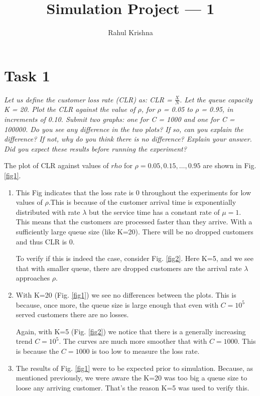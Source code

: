 \documentclass[10pt]{article}
\title{\textbf{Simulation Project --- 1}}
\author{Rahul Krishna}
\affil{North Carolina State University\\Email: \href{mailto:rkrish11@ncsu.edu}{rkrish11@ncsu.edu}\thanks{Source code: \url{https://github.com/rahlk/CSC579__Computer_Performance_Modeling}}}
\date{}
\begin{document}
\maketitle
\section{Task 1}
\label{task1}
\textit{Let us define the customer loss rate
 (CLR) as: CLR = $\frac{X}{N}$. Let the queue capacity K = 20. Plot the CLR against the value of
 $\rho$, for $\rho$ = 0.05 to $\rho$ = 0.95, in increments of 0.10. Submit two graphs: one for C = 1000 and one for C = 100000. Do you see any difference in the two plots? If so, can you explain the difference? If not, why do you think there is no difference? Explain your answer. Did you expect these results before running the experiment?\\}
 
 
 
 The plot of CLR against values of $rho$ for $\rho=0.05, 0.15,\ldots,0.95$ are shown in Fig. \ref{fig1}. 
 
 \begin{enumerate}
 
 \item This Fig indicates that the loss rate is 0 throughout the experiments for low values of $\rho$.This is because of the customer arrival time is exponentially distributed with rate $\lambda$ but the service time has a constant rate of $\mu=1$. This means that the customers are processed faster than they arrive. With a sufficiently large queue size (like K=20). There will be no dropped customers and thus CLR is 0.
 
 To verify if this is indeed the case, consider Fig. \ref{fig2}. Here K=5, and we see that with smaller queue, there are dropped customers are the arrival rate $\lambda$ approaches $\rho$.
 
 \item With K=20 (Fig. \ref{fig1}) we see no differences between the plots. This is because, once more, the queue size is large enough that even with $C=10^5$ served customers there are no losses. 
 
 Again, with K=5 (Fig. \ref{fig2}) we notice that there is a generally increasing trend $C=10^5$. The curves are much more smoother that with $C=1000$. This is because the $C=1000$ is too low to measure the loss rate.
 
 \item The results of Fig. \ref{fig1} were to be expected prior to simulation. Because, as mentioned previously, we were aware the K=20 was too big a queue size to loose any arriving customer. That's the reason K=5 was used to verify this.
 
 \end{enumerate}
\end{document}
